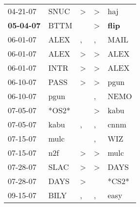 \begin{supertabular}{p{0.07\textwidth}p{0.06\textwidth}p{0.02\textwidth}p{0.02\textwidth}p{0.06\textwidth}}
          04-21-07\textsuperscript{} &           SNUC\textsuperscript{} &     \textgreater &     \textgreater &            haj\textsuperscript{} \\
 \textbf{05-04-07\textsuperscript{}} &           BTTM\textsuperscript{} &                  &     \textgreater &  \textbf{flip\textsuperscript{}} \\
          06-01-07\textsuperscript{} &           ALEX\textsuperscript{} &                , &                , &           MAIL\textsuperscript{} \\
          06-01-07\textsuperscript{} &           ALEX\textsuperscript{} &     \textgreater &     \textgreater &           ALEX\textsuperscript{} \\
          06-01-07\textsuperscript{} &           INTR\textsuperscript{} &     \textgreater &     \textgreater &           ALEX\textsuperscript{} \\
          06-10-07\textsuperscript{} &           PASS\textsuperscript{} &     \textgreater &     \textgreater &           pgun\textsuperscript{} \\
          06-10-07\textsuperscript{} &           pgun\textsuperscript{} &                  &                , &           NEMO\textsuperscript{} \\
          07-05-07\textsuperscript{} &                            *OS2* &                  &     \textgreater &           kabu\textsuperscript{} \\
          07-05-07\textsuperscript{} &           kabu\textsuperscript{} &                , &                , &           cnnm\textsuperscript{} \\
          07-15-07\textsuperscript{} &           mulc\textsuperscript{} &                  &                , &            WIZ\textsuperscript{} \\
          07-15-07\textsuperscript{} &            n2f\textsuperscript{} &     \textgreater &     \textgreater &           mulc\textsuperscript{} \\
          07-28-07\textsuperscript{} &           SLAC\textsuperscript{} &     \textgreater &     \textgreater &           DAYS\textsuperscript{} \\
          07-28-07\textsuperscript{} &           DAYS\textsuperscript{} &     \textgreater &                  &                            *CS2* \\
          09-15-07\textsuperscript{} &           BILY\textsuperscript{} &                , &                , &           easy\textsuperscript{} \\

\end{supertabular}
